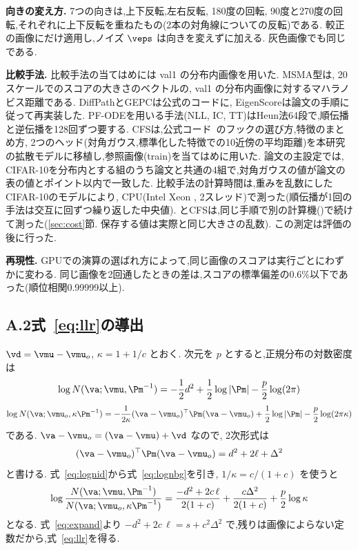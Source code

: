 \textbf{向きの変え方.}
7つの向きは,上下反転,左右反転, 180度の回転, 90度と270度の回転,それぞれに上下反転を重ねたもの(2本の対角線についての反転)である. 較正の画像にだけ適用し,ノイズ $\veps$ は向きを変えずに加える. 灰色画像でも同じである.

\textbf{比較手法.}
比較手法の当てはめには val1 の分布内画像を用いた. MSMA型は, 20スケールでのスコアの大きさのベクトルの, val1 の分布内画像に対するマハラノビス距離である. DiffPathとGEPCは公式のコードに, EigenScoreは論文の手順に従って再実装した. PF-ODEを用いる手法(NLL, IC, TT)はHeun法64段で,順伝播と逆伝播を128回ずつ要する. CFSは,公式コード~\cite{rouzoumka2026cfs}のフックの選び方,特徴のまとめ方, 2つのヘッド(対角ガウス,標準化した特徴での10近傍の平均距離)を本研究の拡散モデルに移植し,参照画像(train)を当てはめに用いた. 論文の主設定では, CIFAR-10を分布内とする組のうち論文と共通の4組で,対角ガウスの値が論文の表の値と\cfsRepMaxDiff{}ポイント以内で一致した. 比較手法の計算時間は,重みを乱数にしたCIFAR-10のモデルにより, CPU(Intel Xeon \cpuGHz, 2スレッド)で測った(順伝播が1回の手法は交互に\cpuReps{}回ずつ繰り返した中央値). \Ours{}とCFSは,同じ手順で別の計算機(\olCpuHere)で続けて測った(\ref{sec:cost}節. 保存する値は実際と同じ大きさの乱数). この測定は評価の後に行った.

\textbf{再現性.}
GPUでの演算の選ばれ方によって,同じ画像のスコアは実行ごとにわずかに変わる. 同じ画像を2回通したときの差は,スコアの標準偏差の0.6\%以下であった(順位相関0.99999以上).

\subsection*{A.2\quad 式~\eqref{eq:llr}の導出}
$\vd=\vmu-\vmu_{o}$, $\kappa=1+1/c$ とおく. 次元を $p$ とすると,正規分布の対数密度は
\begin{equation}
\log N(\va;\vmu,\Pm^{-1})=-\frac{1}{2}d^{2}+\frac{1}{2}\log|\Pm|-\frac{p}{2}\log(2\pi)
\label{eq:lognid}
\end{equation}
\begin{equation}
\log N(\va;\vmu_{o},\kappa\Pm^{-1})=-\frac{1}{2\kappa}(\va-\vmu_{o})^{\top}\Pm(\va-\vmu_{o})+\frac{1}{2}\log|\Pm|-\frac{p}{2}\log(2\pi\kappa)
\label{eq:lognbg}
\end{equation}
である. $\va-\vmu_{o}=(\va-\vmu)+\vd$ なので, 2次形式は
\begin{equation}
(\va-\vmu_{o})^{\top}\Pm(\va-\vmu_{o})=d^{2}+2\ell+\Delta^{2}
\label{eq:quadbg}
\end{equation}
と書ける. 式~\eqref{eq:lognid}から式~\eqref{eq:lognbg}を引き, $1/\kappa=c/(1+c)$ を使うと
\begin{equation}
\log\frac{N(\va;\vmu,\Pm^{-1})}{N(\va;\vmu_{o},\kappa\Pm^{-1})}=\frac{-d^{2}+2c\,\ell}{2(1+c)}+\frac{c\Delta^{2}}{2(1+c)}+\frac{p}{2}\log\kappa
\label{eq:llrfull}
\end{equation}
となる. 式~\eqref{eq:expand}より $-d^{2}+2c\,\ell=s+c^{2}\Delta^{2}$ で,残りは画像によらない定数だから,式~\eqref{eq:llr}を得る.


